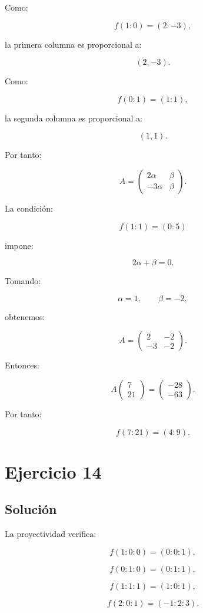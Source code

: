 \documentclass[11pt,a4paper]{article}
\begin{document}
Como:

\[
f(1:0)=(2:-3),
\]

la primera columna es proporcional a:

\[
(2,-3).
\]

Como:

\[
f(0:1)=(1:1),
\]

la segunda columna es proporcional a:

\[
(1,1).
\]

Por tanto:

\[
A=
\begin{pmatrix}
2\alpha&\beta\\
-3\alpha&\beta
\end{pmatrix}.
\]

La condición:

\[
f(1:1)=(0:5)
\]

impone:

\[
2\alpha+\beta=0.
\]

Tomando:

\[
\alpha=1,
\qquad
\beta=-2,
\]

obtenemos:

\[
A=
\begin{pmatrix}
2&-2\\
-3&-2
\end{pmatrix}.
\]

Entonces:

\[
A
\begin{pmatrix}
7\\21
\end{pmatrix}
=
\begin{pmatrix}
-28\\-63
\end{pmatrix}.
\]

Por tanto:

\[
\boxed{
f(7:21)=(4:9).
}
\]

\section{Ejercicio 14}
\subsection{Solución}

La proyectividad verifica:

\[
f(1:0:0)=(0:0:1),
\]

\[
f(0:1:0)=(0:1:1),
\]

\[
f(1:1:1)=(1:0:1),
\]

\[
f(2:0:1)=(-1:2:3).
\]
\end{document}
